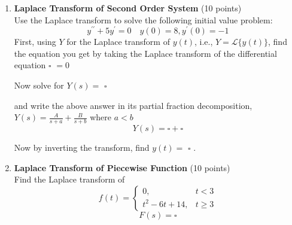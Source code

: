 \begin{enumerate}
  \item \textbf{Laplace Transform of Second Order System} (10 points)\\
  Use the Laplace transform to solve the following initial value problem:
  $$
  y^{\prime \prime}+5 y^{\prime}=0 \quad y(0)=8, y^{\prime}(0)=-1
  $$
  First, using $Y$ for the Laplace transform of $y(t)$, i.e., $Y=\mathcal{L}\{y(t)\}$, find the equation you get by taking the Laplace transform of the differential equation
  $\square$ $=0$
  \begin{subanswer}
  \end{subanswer}
  Now solve for $Y(s)=$ $\square$
  \begin{subanswer}
  \end{subanswer}
  and write the above answer in its partial fraction decomposition, $Y(s)=\frac{A}{s+a}+\frac{B}{s+b}$ where $a<b$
  $$
  Y(s)=\square+\square
  $$
  \begin{subanswer}
  \end{subanswer}
  Now by inverting the transform, find $y(t)=$ $\square$ .
  \begin{subanswer}
  \end{subanswer}

  \item \textbf{Laplace Transform of Piecewise Function} (10 points)\\
  Find the Laplace transform of
  $$
  f(t)= \begin{cases}0, & t<3 \\ t^2-6 t+14, & t \geq 3\end{cases}
  $$
  $$
  F(s)=\square
  $$
  \begin{subanswer}
  \end{subanswer}


\end{enumerate}
